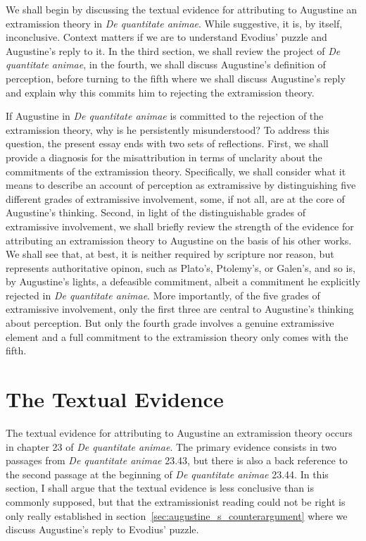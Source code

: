 \documentclass[12pt]{article}
\begin{document}
We shall begin by discussing the textual evidence for attributing to Augustine an extramission theory in \emph{De quantitate animae}. While suggestive, it is, by itself, inconclusive. Context matters if we are to understand Evodius' puzzle and Augustine's reply to it. In the third section, we shall review the project of \emph{De quantitate animae}, in the fourth, we shall discuss Augustine's definition of perception, before turning to the fifth where we shall discuss Augustine's reply and explain why this commits him to rejecting the extramission theory. 

If Augustine in \emph{De quantitate animae} is committed to the rejection of the extramission theory, why is he persistently misunderstood? To address this question, the present essay ends with two sets of reflections. First, we shall provide a diagnosis for the misattribution in terms of unclarity about the commitments of the extramission theory. Specifically, we shall consider what it means to describe an account of perception as extramissive by distinguishing five different grades of extramissive involvement, some, if not all, are at the core of Augustine's thinking. Second, in light of the distinguishable grades of extramissive involvement, we shall briefly review the strength of the evidence for attributing an extramission theory to Augustine on the basis of his other works. We shall see that, at best, it is neither required by scripture nor reason, but represents authoritative opinon, such as Plato's, Ptolemy's, or Galen's, and so is, by Augustine's lights, a defeasible commitment, albeit a commitment he explicitly rejected in \emph{De quantitate animae}. More importantly, of the five grades of extramissive involvement, only the first three are central to Augustine's thinking about perception. But only the fourth grade involves a genuine extramissive element and a full commitment to the extramission theory only comes with the fifth.


\section{The Textual Evidence} %
\label{sec:the_textual_evidence}

The textual evidence for attributing to Augustine an extramission theory occurs in chapter 23 of \emph{De quantitate animae}. The primary evidence consists in two passages from \emph{De quantitate animae} 23.43, but there is also a back reference to the second passage at the beginning of \emph{De quantitate animae} 23.44. In this section, I shall argue that the textual evidence is less conclusive than is commonly supposed, but that the extramissionist reading could not be right is only really established in section~\ref{sec:augustine_s_counterargument} where we discuss Augustine's reply to Evodius' puzzle.
\end{document}
